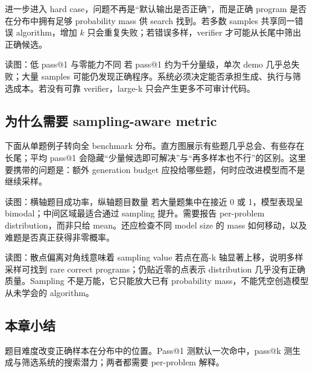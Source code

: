 进一步进入 hard case，问题不再是“默认输出是否正确”，而是正确 program 是否在分布中拥有足够 probability mass 供 search 找到。若多数 samples 共享同一错误 algorithm，增加 $k$ 只会重复失败；若错误多样，verifier 才可能从长尾中筛出正确候选。


\begin{knowledgebox}{读图：低 pass@1 与零能力不同}
若 pass@1 约为千分量级，单次 demo 几乎总失败；大量 samples 可能仍发现正确程序。系统必须决定能否承担生成、执行与筛选成本。若没有可靠 verifier，large-k 只会产生更多不可审计代码。
\end{knowledgebox}

\subsection{为什么需要 sampling-aware metric}

下面从单题例子转向全 benchmark 分布。直方图展示有些题几乎总会、有些存在长尾；平均 pass@1 会隐藏“少量候选即可解决”与“再多样本也不行”的区别。这里要携带的问题是：额外 generation budget 应投给哪些题，何时应改进模型而不是继续采样。


\begin{knowledgebox}{读图：横轴题目成功率，纵轴题目数量}
若大量题集中在接近 0 或 1，模型表现呈 bimodal；中间区域最适合通过 sampling 提升。需要报告 per-problem distribution，而非只给 mean。还应检查不同 model size 的 mass 如何移动，以及难题是否真正获得非零概率。
\end{knowledgebox}


\begin{knowledgebox}{读图：散点偏离对角线意味着 sampling value}
若点在高-k 轴显著上移，说明多样采样可找到 rare correct programs；仍贴近零的点表示 distribution 几乎没有正确质量。Sampling 不是万能，它只能放大已有 probability mass，不能凭空创造模型从未学会的 algorithm。
\end{knowledgebox}

\subsection{本章小结}

题目难度改变正确样本在分布中的位置。Pass@1 测默认一次命中，pass@k 测生成与筛选系统的搜索潜力；两者都需要 per-problem 解释。

